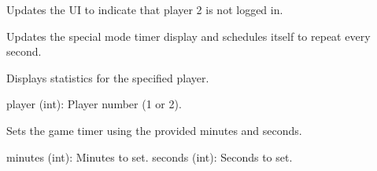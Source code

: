 \documentclass[letterpaper,10pt,english]{sphinxmanual}
\begin{document}
\begin{fulllineitems}
\begin{fulllineitems}
\end{fulllineitems}


\begin{fulllineitems}
\label{\detokenize{modules:GUI.HangmanGUI.player2_not_logged_in}}
\pysigstartsignatures
{}
\pysigstopsignatures
\sphinxAtStartPar
Updates the UI to indicate that player 2 is not logged in.

\end{fulllineitems}


\begin{fulllineitems}
\label{\detokenize{modules:GUI.HangmanGUI.repeated_over_time_code}}
\pysigstartsignatures
{}
\pysigstopsignatures
\sphinxAtStartPar
Updates the special mode timer display and schedules itself to repeat every second.

\end{fulllineitems}


\begin{fulllineitems}
\label{\detokenize{modules:GUI.HangmanGUI.set_statistics_frame}}
\pysigstartsignatures
{}
\pysigstopsignatures
\sphinxAtStartPar
Displays statistics for the specified player.
\begin{description}
\sphinxAtStartPar
player (int): Player number (1 or 2).

\end{description}

\end{fulllineitems}


\begin{fulllineitems}
\label{\detokenize{modules:GUI.HangmanGUI.set_time}}
\pysigstartsignatures
{}
\pysigstopsignatures
\sphinxAtStartPar
Sets the game timer using the provided minutes and seconds.
\begin{description}
\sphinxAtStartPar
minutes (int): Minutes to set.
seconds (int): Seconds to set.


\end{description}
\end{fulllineitems}
\end{fulllineitems}
\end{document}
